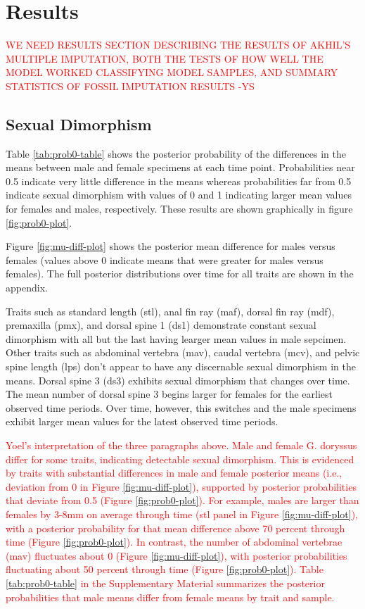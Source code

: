 \documentclass[
  12pt,
]{article}
\begin{document}
\hypertarget{sec:results}{%
\section{Results}\label{sec:results}}

\textcolor{red}{WE NEED RESULTS SECTION DESCRIBING THE RESULTS OF AKHIL'S MULTIPLE IMPUTATION, BOTH THE TESTS OF HOW WELL THE MODEL WORKED CLASSIFYING MODEL SAMPLES, AND SUMMARY STATISTICS OF FOSSIL IMPUTATION RESULTS -YS}

\hypertarget{sexual-dimorphism}{%
\subsection{Sexual Dimorphism}\label{sexual-dimorphism}}

Table \ref{tab:prob0-table} shows the posterior probability of the
differences in the means between male and female specimens at each time
point. Probabilities near 0.5 indicate very little difference in the
means whereas probabilities far from 0.5 indicate sexual dimorphism with
values of 0 and 1 indicating larger mean values for females and males,
respectively. These results are shown graphically in figure
\ref{fig:prob0-plot}.

Figure \ref{fig:mu-diff-plot} shows the posterior mean difference for
males versus females (values above 0 indicate means that were greater
for males versus females). The full posterior distributions over time
for all traits are shown in the appendix.

Traits such as standard length (stl), anal fin ray (maf), dorsal fin ray
(mdf), premaxilla (pmx), and dorsal spine 1 (ds1) demonstrate constant
sexual dimorphism with all but the last having learger mean values in
male sepcimen. Other traits such as abdominal vertebra (mav), caudal
vertebra (mcv), and pelvic spine length (lps) don't appear to have any
discernable sexual dimorphism in the means. Dorsal spine 3 (ds3)
exhibits sexual dimorphism that changes over time. The mean number of
dorsal spine 3 begins larger for females for the earliest observed time
periods. Over time, however, this switches and the male specimens
exhibit larger mean values for the latest observed time periods.

\textcolor{red} {
Yoel's interpretation of the three paragraphs above. Male and female G. doryssus differ for some traits, indicating detectable sexual dimorphism. This is evidenced by traits with substantial differences in male and female posterior means (i.e., deviation from 0 in Figure \ref{fig:mu-diff-plot}), supported by posterior probabilities that deviate from 0.5 (Figure \ref{fig:prob0-plot}). For example, males are larger than females by 3-8mm on average through time (stl panel in Figure \ref{fig:mu-diff-plot}), with a posterior probability for that mean difference above 70 percent through time (Figure \ref{fig:prob0-plot}). In contrast, the number of abdominal vertebrae (mav) fluctuates about 0 (Figure \ref{fig:mu-diff-plot}), with posterior probabilities fluctuating about 50 percent through time (Figure \ref{fig:prob0-plot}). Table \ref{tab:prob0-table} in the Supplementary Material summarizes the posterior probabilities that male means differ from female means by trait and sample.
}
\end{document}
